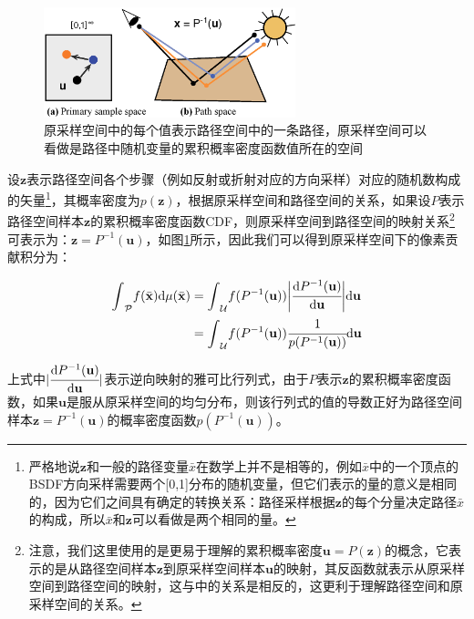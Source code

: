 \begin{figure}
	\sidecaption
	\includegraphics[width=0.65\textwidth]{figures/mlt/primary-space}
	\caption{原采样空间中的每个值表示路径空间中的一条路径，原采样空间可以看做是路径中随机变量的累积概率密度函数值所在的空间}
	\label{f:mlt-primary-space}
\end{figure}

设$\mathbf{z}$表示路径空间各个步骤（例如反射或折射对应的方向采样）对应的随机数构成的矢量\footnote{严格地说$\mathbf{z}$和一般的路径变量$\bar{x}$在数学上并不是相等的，例如$\bar{x}$中的一个顶点的BSDF方向采样需要两个[0,1]分布的随机变量，但它们表示的量的意义是相同的，因为它们之间具有确定的转换关系：路径采样根据$\mathbf{z}$的每个分量决定路径$\bar{x}$的构成，所以$\bar{x}$和$\mathbf{z}$可以看做是两个相同的量。}，其概率密度为$p(\mathbf{z})$，根据原采样空间和路径空间的关系，如果设$P$表示路径空间样本$\mathbf{z}$的累积概率密度函数CDF，则原采样空间到路径空间的映射关系\footnote{注意，我们这里使用的是更易于理解的累积概率密度$\mathbf{u}=P(\mathbf{z})$的概念，它表示的是从路径空间样本$\mathbf{z}$到原采样空间样本$\mathbf{u}$的映射，其反函数就表示从原采样空间到路径空间的映射，这与\cite{a:ASimpleandRobustMutationStrategyfortheMetropolisLightTransportAlgorithm}中的关系是相反的，这更利于理解路径空间和原采样空间的关系。}可表示为：$\mathbf{z}=P^{-1}(\mathbf{u})$，如图\ref{f:mlt-primary-space}所示，因此我们可以得到原采样空间下的像素贡献积分为：

\begin{equation}\label{e:mlt-pssmlt-mapping}
\begin{aligned}
	{\rm \int}_{\mathcal{P}}f(\bar{\mathbf{x}}){\rm d}\mu(\bar{\mathbf{x}})&={\rm \int}_{\mathcal{U}}f(P^{-1}(\mathbf{u}))\bigg| \cfrac{{\rm d}P^{-1}(\mathbf{u})}{{\rm d}\mathbf{u}}\bigg|{\rm d}\mathbf{u}\\
	&={\rm \int}_{\mathcal{U}}f(P^{-1}(\mathbf{u})) \cfrac{1}{p(P^{-1}(\mathbf{u}))}{\rm d}\mathbf{u}
\end{aligned}
\end{equation}

\noindent 上式中$| \cfrac{{\rm d}P^{-1}(\mathbf{u})}{{\rm d}\mathbf{u}}|$表示逆向映射的雅可比行列式，由于$P$表示$\mathbf{z}$的累积概率密度函数，如果$\mathbf{u}$是服从原采样空间的均匀分布，则该行列式的值的导数正好为路径空间样本$\mathbf{z}=P^{-1}(\mathbf{u})$的概率密度函数$p(P^{-1}(\mathbf{u}))$。

